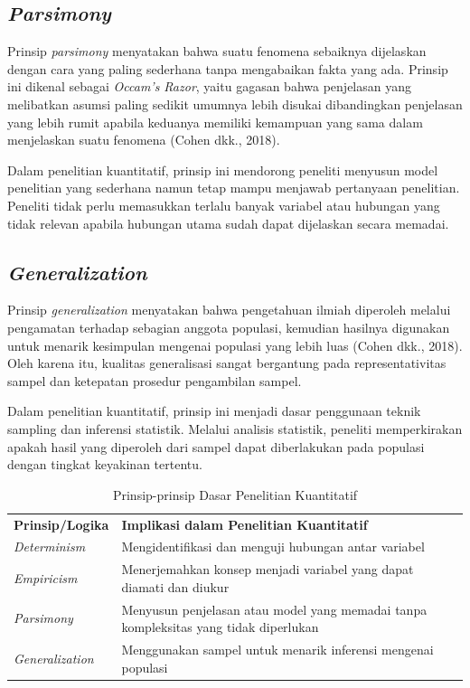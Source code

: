 \documentclass[
  indonesian,
  letterpaper,
  DIV=11,
  numbers=noendperiod]{scrreprt}
\begin{document}
\subsection{\texorpdfstring{\emph{Parsimony}}{Parsimony}}\label{parsimony}

Prinsip \emph{parsimony} menyatakan bahwa suatu fenomena sebaiknya
dijelaskan dengan cara yang paling sederhana tanpa mengabaikan fakta
yang ada. Prinsip ini dikenal sebagai \emph{Occam's Razor}, yaitu
gagasan bahwa penjelasan yang melibatkan asumsi paling sedikit umumnya
lebih disukai dibandingkan penjelasan yang lebih rumit apabila keduanya
memiliki kemampuan yang sama dalam menjelaskan suatu fenomena (Cohen
dkk., 2018).

Dalam penelitian kuantitatif, prinsip ini mendorong peneliti menyusun
model penelitian yang sederhana namun tetap mampu menjawab pertanyaan
penelitian. Peneliti tidak perlu memasukkan terlalu banyak variabel atau
hubungan yang tidak relevan apabila hubungan utama sudah dapat
dijelaskan secara memadai.

\subsection{\texorpdfstring{\emph{Generalization}}{Generalization}}\label{generalization}

Prinsip \emph{generalization} menyatakan bahwa pengetahuan ilmiah
diperoleh melalui pengamatan terhadap sebagian anggota populasi,
kemudian hasilnya digunakan untuk menarik kesimpulan mengenai populasi
yang lebih luas (Cohen dkk., 2018). Oleh karena itu, kualitas
generalisasi sangat bergantung pada representativitas sampel dan
ketepatan prosedur pengambilan sampel.

Dalam penelitian kuantitatif, prinsip ini menjadi dasar penggunaan
teknik sampling dan inferensi statistik. Melalui analisis statistik,
peneliti memperkirakan apakah hasil yang diperoleh dari sampel dapat
diberlakukan pada populasi dengan tingkat keyakinan tertentu.

\begin{longtable}[]{@{}
  >{\raggedright\arraybackslash}p{}
  >{\raggedright\arraybackslash}p{}@{}}
\caption{Prinsip-prinsip Dasar Penelitian
Kuantitatif}\label{tbl-prinsipkuantitatif}\tabularnewline
\toprule\noalign{}
\endfirsthead
\endhead
\bottomrule\noalign{}
\endlastfoot
\textbf{Prinsip/Logika} & \textbf{Implikasi dalam Penelitian
Kuantitatif} \\
\emph{Determinism} & Mengidentifikasi dan menguji hubungan antar
variabel \\
\emph{Empiricism} & Menerjemahkan konsep menjadi variabel yang dapat
diamati dan diukur \\
\emph{Parsimony} & Menyusun penjelasan atau model yang memadai tanpa
kompleksitas yang tidak diperlukan \\
\emph{Generalization} & Menggunakan sampel untuk menarik inferensi
mengenai populasi \\
\end{longtable}
\end{document}
